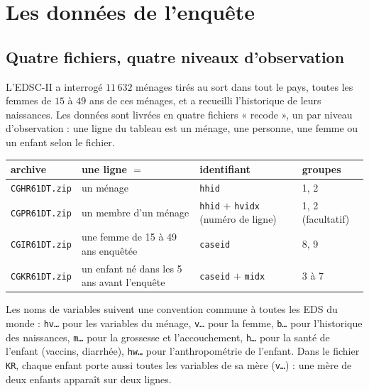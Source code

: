 \documentclass[11pt]{article}
\begin{document}
\section{Les données de l'enquête}
\label{sec:donnees}

\subsection{Quatre fichiers, quatre niveaux d'observation}

L'EDSC-II a interrogé $11\,632$ ménages tirés au sort dans tout le pays, toutes les femmes de $15$ à $49$ ans de ces ménages, et a recueilli l'historique de leurs naissances. Les données sont livrées en quatre fichiers « recode », un par niveau d'observation : une ligne du tableau est un ménage, une personne, une femme ou un enfant selon le fichier.

\begin{center}
  \small\renewcommand{\arraystretch}{1.2}
  \begin{tabular}{l>{\raggedright\arraybackslash}p{}>{\raggedright\arraybackslash}p{}l}
    \toprule
    \textbf{archive} & \textbf{une ligne $=$} & \textbf{identifiant} & \textbf{groupes} \\
    \midrule
    \texttt{CGHR61DT.zip} & un ménage & \texttt{hhid} & 1, 2 \\
    \texttt{CGPR61DT.zip} & un membre d'un ménage & \texttt{hhid} $+$ \texttt{hvidx} (numéro de ligne) & 1, 2 (facultatif) \\
    \texttt{CGIR61DT.zip} & une femme de 15 à 49 ans enquêtée & \texttt{caseid} & 8, 9 \\
    \texttt{CGKR61DT.zip} & un enfant né dans les 5 ans avant l'enquête & \texttt{caseid} $+$ \texttt{midx} & 3 à 7 \\
    \bottomrule
  \end{tabular}
\end{center}

Les noms de variables suivent une convention commune à toutes les EDS du monde : \texttt{hv\dots} pour les variables du ménage, \texttt{v\dots} pour la femme, \texttt{b\dots} pour l'historique des naissances, \texttt{m\dots} pour la grossesse et l'accouchement, \texttt{h\dots} pour la santé de l'enfant (vaccins, diarrhée), \texttt{hw\dots} pour l'anthropométrie de l'enfant. Dans le fichier \texttt{KR}, chaque enfant porte aussi toutes les variables de sa mère (\texttt{v\dots}) : une mère de deux enfants apparaît sur deux lignes.
\end{document}
